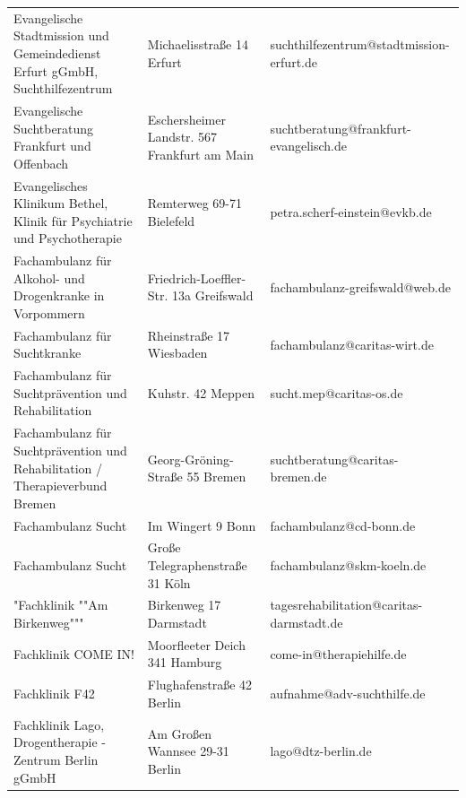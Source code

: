 {\begin{xltabular}{\textwidth} {
 >{\raggedright\arraybackslash}p{5cm}
 >{\raggedright\arraybackslash}X
 >{\raggedright\arraybackslash}p{5cm} }
Evangelische Stadtmission und Gemeindedienst Erfurt gGmbH, Suchthilfezentrum & Michaelisstraße 14 Erfurt & suchthilfezentrum@stadtmission-erfurt.de \\
Evangelische Suchtberatung Frankfurt und Offenbach & Eschersheimer Landstr. 567 Frankfurt am Main & suchtberatung@frankfurt-evangelisch.de \\
Evangelisches Klinikum Bethel, Klinik für Psychiatrie und Psychotherapie & Remterweg 69-71 Bielefeld & petra.scherf-einstein@evkb.de \\
Fachambulanz für Alkohol- und Drogenkranke in Vorpommern & Friedrich-Loeffler-Str. 13a Greifswald & fachambulanz-greifswald@web.de \\
Fachambulanz für Suchtkranke & Rheinstraße 17 Wiesbaden & fachambulanz@caritas-wirt.de \\
Fachambulanz für Suchtprävention und Rehabilitation & Kuhstr. 42 Meppen & sucht.mep@caritas-os.de \\
Fachambulanz für Suchtprävention und Rehabilitation / Therapieverbund Bremen & Georg-Gröning-Straße 55 Bremen & suchtberatung@caritas-bremen.de \\
Fachambulanz Sucht & Im Wingert 9 Bonn & fachambulanz@cd-bonn.de \\
Fachambulanz Sucht & Große Telegraphenstraße 31 Köln & fachambulanz@skm-koeln.de \\
"Fachklinik ""Am Birkenweg""" & Birkenweg 17 Darmstadt & tagesrehabilitation@caritas-darmstadt.de \\
Fachklinik COME IN! & Moorfleeter Deich 341 Hamburg & come-in@therapiehilfe.de \\
Fachklinik F42 & Flughafenstraße 42 Berlin & aufnahme@adv-suchthilfe.de \\
Fachklinik Lago, Drogentherapie - Zentrum Berlin gGmbH & Am Großen Wannsee 29-31 Berlin & lago@dtz-berlin.de \\

\end{xltabular}}
